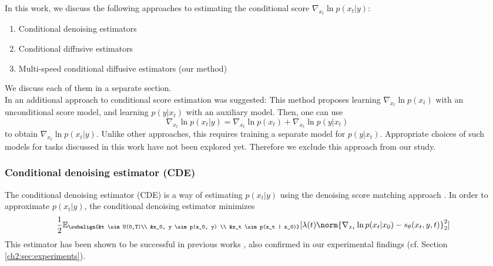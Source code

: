 In this work, we discuss the following approaches to estimating the conditional score $\nabla_{x_t} \ln p(x_t|y)$:
\begin{enumerate}
    \item Conditional denoising estimators
    \item Conditional diffusive estimators
    \item Multi-speed conditional diffusive estimators (our method)
\end{enumerate}
We discuss each of them in a separate section.\\

In \cite{song2021sde} an additional approach to conditional score estimation was suggested:
This method proposes learning $\nabla_{x_t} \ln p(x_t)$ with an unconditional score model, and  learning $p(y | x_t)$ with an auxiliary model. Then, one can use 
    \begin{equation*}
        \nabla_{x_t}\ln p(x_t |y) = \nabla_{x_t} \ln p(x_t) + \nabla_{x_t} \ln p(y | x_t)
    \end{equation*}
to obtain $\nabla_{x_t} \ln p(x_t | y)$. Unlike other approaches, this requires training a separate model for $p(y|x_t)$. Appropriate choices of such models for tasks discussed in this work have not been explored yet. Therefore we exclude this approach from our study. 

\subsubsection{Conditional denoising estimator (CDE)}
The conditional denoising estimator (CDE) is a way of estimating $p(x_t|y)$ using the denoising score matching approach \cite{vincent2011connection, song2020generative_score}. In order to approximate $p(x_t|y)$, the conditional denoising estimator minimizes
\begin{gather}
\begin{aligned}
        \label{ch2:CDN}
        &\frac{1}{2} \mathbb{E}_{\subalign{&t \sim U(0,T)\\ &x_0, y \sim p(x_0, y) \\ &x_t \sim p(x_t | x_0)}} 
        [\lambda(t) \norm{\nabla_{x_t} \ln{p(x_t | x_0)} - s_\theta(x_t, y, t)}_2^2]
\end{aligned}
\end{gather}
This estimator has been shown to be successful in previous works \cite{saharia2021sr3,tashiro2021csdi}, also confirmed in our experimental findings (cf. Section \ref{ch2:sec:experiments}). 

